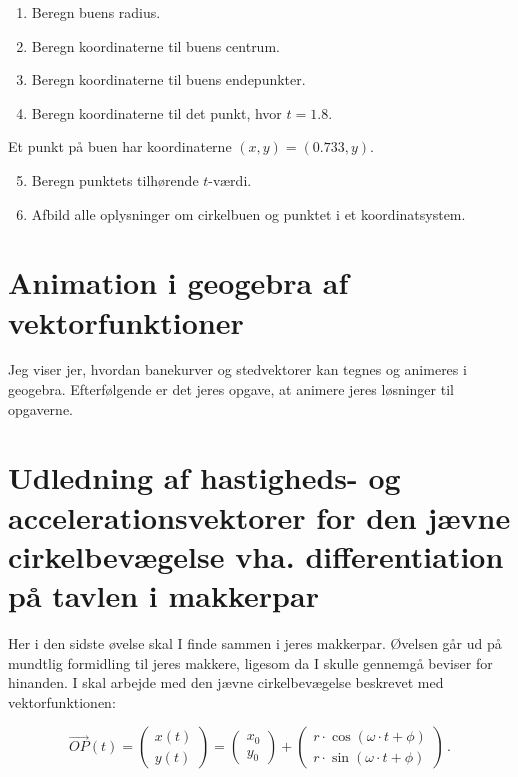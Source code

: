 \documentclass[a4paper, 12pt]{article}
\begin{document}
\begin{enumerate}
\item Beregn buens radius.
\item Beregn koordinaterne til buens centrum.
\item Beregn koordinaterne til buens endepunkter.
\item Beregn koordinaterne til det punkt, hvor \(t=1.8\).
\end{enumerate}

Et punkt på buen har koordinaterne \((x,y) = (0.733,y)\).

\begin{enumerate}
\setcounter{enumi}{4}
\item Beregn punktets tilhørende \(t\)​-værdi.
\item Afbild alle oplysninger om cirkelbuen og punktet i et koordinatsystem.
\end{enumerate}
\section*{Animation i geogebra af vektorfunktioner}
\label{sec:org887eb19}

Jeg viser jer, hvordan banekurver og stedvektorer kan tegnes og animeres i geogebra. Efterfølgende er det jeres opgave, at animere jeres løsninger til opgaverne.
\section*{Udledning af hastigheds- og accelerationsvektorer for den jævne cirkelbevægelse vha. differentiation på tavlen i makkerpar}
\label{sec:org304e4da}

Her i den sidste øvelse skal I finde sammen i jeres makkerpar. Øvelsen går ud på mundtlig formidling til jeres makkere, ligesom da I skulle gennemgå beviser for hinanden. I skal arbejde med den jævne cirkelbevægelse beskrevet med vektorfunktionen:

$$\overrightarrow{OP}(t) = \begin{pmatrix} x(t) \\ y(t) \end{pmatrix} = \begin{pmatrix} x_0 \\ y_0 \end{pmatrix} + \begin{pmatrix} r \cdot \cos \left( \omega \cdot t + \phi \right) \\ r \cdot \sin \left(\omega \cdot t + \phi \right) \end{pmatrix} \,.$$
\end{document}
